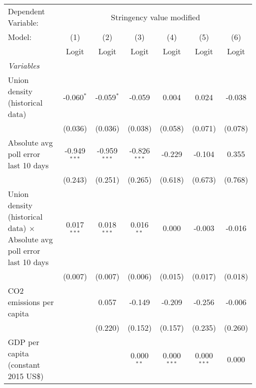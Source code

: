 
\begingroup
\centering
\begin{tabular}{lcccccc}
   \toprule
   Dependent Variable: & \multicolumn{6}{c}{Stringency value modified}\\
   Model:                                                                         & (1)            & (2)            & (3)            & (4)           & (5)           & (6)\\  
                                                                                  &  Logit         & Logit          & Logit          & Logit         & Logit         & Logit\\  
   \midrule
   \emph{Variables}\\
   Union density (historical data)                                                & -0.060$^{*}$   & -0.059$^{*}$   & -0.059         & 0.004         & 0.024         & -0.038\\   
                                                                                  & (0.036)        & (0.036)        & (0.038)        & (0.058)       & (0.071)       & (0.078)\\   
   Absolute avg poll error last 10 days                                           & -0.949$^{***}$ & -0.959$^{***}$ & -0.826$^{***}$ & -0.229        & -0.104        & 0.355\\   
                                                                                  & (0.243)        & (0.251)        & (0.265)        & (0.618)       & (0.673)       & (0.768)\\   
   Union density (historical data) $\times$ Absolute avg poll error last 10 days  & 0.017$^{***}$  & 0.018$^{***}$  & 0.016$^{**}$   & 0.000         & -0.003        & -0.016\\   
                                                                                  & (0.007)        & (0.007)        & (0.006)        & (0.015)       & (0.017)       & (0.018)\\   
   CO2 emissions per capita                                                       &                & 0.057          & -0.149         & -0.209        & -0.256        & -0.006\\   
                                                                                  &                & (0.220)        & (0.152)        & (0.157)       & (0.235)       & (0.260)\\   
   GDP per capita (constant 2015 US\$)                                            &                &                & 0.000$^{**}$   & 0.000$^{***}$ & 0.000$^{***}$ & 0.000\\   

\end{tabular}
